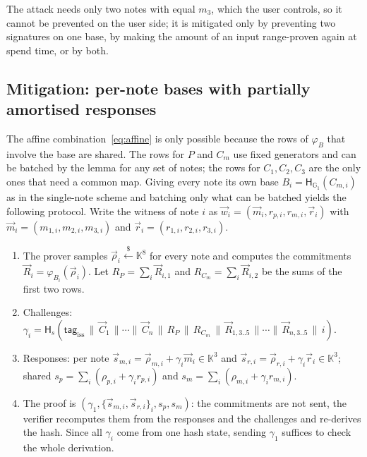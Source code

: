 \documentclass[10pt,a5paper]{article}
\newcommand{\K}[1]{#1}                      %
\newcommand{\Go}[1]{#1}                     %
\newcommand{\K}[1]{{\color{ScalarCol}#1}}   %
\newcommand{\Go}[1]{{\color{GoneCol}#1}}    %
\newcommand{\F}{\mathbb{K}}
\newcommand{\GG}[1]{\mathbb{G}_{#1}}
\newcommand{\Hs}{\mathsf{H}_{s}}
\newcommand{\Hg}{\mathsf{H}_{\GG{1}}}
\newcommand{\dtag}{\mathsf{tag}}
\newcommand{\vv}[1]{\vec{#1}}
\newcommand{\sample}{\stackrel{\$}{\leftarrow}}
\begin{document}
The attack needs only two notes with equal $\K{m_3}$, which the user controls,
so it cannot be prevented on the user side; it is mitigated only by preventing
two signatures on one base, by making the amount of an input range-proven again
at spend time, or by both.

\subsection{Mitigation: per-note bases with partially amortised responses}
\label{sec:mitigation}

The affine combination~\eqref{eq:affine} is only possible because the rows of
$\varphi_{\Go{B}}$ that involve the base are shared. The rows for $\Go{P}$ and
$\Go{C_m}$ use fixed generators and can be batched by the lemma for any set of
notes; the rows for $\Go{C_1},\Go{C_2},\Go{C_3}$ are the only ones that need a
common map. Giving every note its own base $\Go{B_i} = \Hg(\Go{C_{m,i}})$ as in
the single-note scheme and batching only what can be batched yields the
following protocol. Write the witness of note $i$ as
$\vv{w}_i = (\vv{m}_i, \K{r_{p,i}}, \K{r_{m,i}}, \vv{r}_i)$ with
$\vv{m}_i = (\K{m_{1,i}},\K{m_{2,i}},\K{m_{3,i}})$ and $\vv{r}_i = (\K{r_{1,i}},\K{r_{2,i}},\K{r_{3,i}})$.
\begin{enumerate}[nosep]
  \item The prover samples $\vv{\rho}_i \sample \F^8$ for every note and
        computes the commitments $\vv{R}_i = \varphi_{\Go{B_i}}(\vv{\rho}_i)$.
        Let $\Go{R_P} = \sum_i \vv{R}_{i,1}$ and $\Go{R_{C_m}} = \sum_i \vv{R}_{i,2}$
        be the sums of the first two rows.
  \item Challenges: $\K{\gamma_i} = \Hs(\dtag_{\mathrm{iss}} \,\|\, \vv{C}_1 \,\|\cdots\|\, \vv{C}_n \,\|\, \Go{R_P} \,\|\, \Go{R_{C_m}} \,\|\, \vv{R}_{1,3..5} \,\|\cdots\|\, \vv{R}_{n,3..5} \,\|\, i)$.
  \item Responses: per note
        $\vv{s}_{m,i} = \vv{\rho}_{m,i} + \K{\gamma_i}\vv{m}_i \in \F^3$ and
        $\vv{s}_{r,i} = \vv{\rho}_{r,i} + \K{\gamma_i}\vv{r}_i \in \F^3$;
        shared
        $\K{s_p} = \sum_i (\K{\rho_{p,i}} + \K{\gamma_i}\K{r_{p,i}})$ and
        $\K{s_m} = \sum_i (\K{\rho_{m,i}} + \K{\gamma_i}\K{r_{m,i}})$.
  \item The proof is $(\K{\gamma_1}, \{\vv{s}_{m,i}, \vv{s}_{r,i}\}_i, \K{s_p}, \K{s_m})$:
        the commitments are not sent, the verifier recomputes them from the
        responses and the challenges and re-derives the hash. Since all
        $\K{\gamma_i}$ come from one hash state, sending $\K{\gamma_1}$ suffices
        to check the whole derivation.
\end{enumerate}
\end{document}
